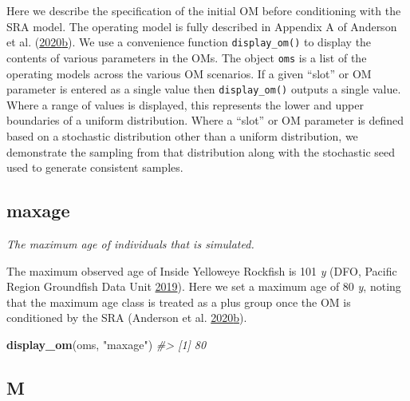\documentclass[11pt]{book}
\newenvironment{Shaded}{\begin{snugshade}}{\end{snugshade}}
\newcommand{\CommentTok}[1]{\textcolor[rgb]{0.56,0.35,0.01}{\textit{#1}}}
\newcommand{\KeywordTok}[1]{\textcolor[rgb]{0.13,0.29,0.53}{\textbf{#1}}}
\newcommand{\NormalTok}[1]{#1}
\newcommand{\StringTok}[1]{\textcolor[rgb]{0.31,0.60,0.02}{#1}}
\begin{document}
\label{app:desc-om-yelloweye}

Here we describe the specification of the initial OM before conditioning with the SRA model. The operating model is fully described in Appendix A of Anderson et al. (\protect\hyperlink{ref-anderson2020gfmp}{2020}\protect\hyperlink{ref-anderson2020gfmp}{b}). We use a convenience function \texttt{display\_om()} to display the contents of various parameters in the OMs. The object \texttt{oms} is a list of the operating models across the various OM scenarios. If a given ``slot'' or OM parameter is entered as a single value then \texttt{display\_om()} outputs a single value. Where a range of values is displayed, this represents the lower and upper boundaries of a uniform distribution. Where a ``slot'' or OM parameter is defined based on a stochastic distribution other than a uniform distribution, we demonstrate the sampling from that distribution along with the stochastic seed used to generate consistent samples.

\label{app:desc-stock-yelloweye}

\label{app:desc-stock-maxage-yelloweye}
\subsection{maxage}

\emph{The maximum age of individuals that is simulated.}

The maximum observed age of Inside Yelloweye Rockfish is 101 \emph{y} (DFO, Pacific Region Groundfish Data Unit \protect\hyperlink{ref-databases2019}{2019}). Here we set a maximum age of 80 \emph{y}, noting that the maximum age class is treated as a plus group once the OM is conditioned by the SRA (Anderson et al. \protect\hyperlink{ref-anderson2020gfmp}{2020}\protect\hyperlink{ref-anderson2020gfmp}{b}).
\begin{Shaded}
\begin{Highlighting}[]
\KeywordTok{display_om}\NormalTok{(oms, }\StringTok{"maxage"}\NormalTok{)}
\CommentTok{#> [1] 80}
\end{Highlighting}
\end{Shaded}
\label{app:desc-stock-m-yelloweye}
\subsection{M}
\end{document}
